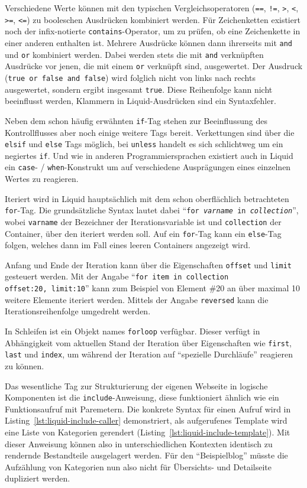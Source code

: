 Verschiedene Werte können mit den typischen Vergleichsoperatoren (\texttt{==}, \texttt{!=}, \texttt{>}, \texttt{<}, \texttt{>=}, \texttt{<=}) zu booleschen Ausdrücken kombiniert werden. Für Zeichenketten existiert noch der infix-notierte \texttt{contains}-Operator, um zu prüfen, ob eine Zeichenkette in einer anderen enthalten ist. Mehrere Ausdrücke können dann ihrerseits  mit \texttt{and} und \texttt{or} kombiniert werden. Dabei werden stets die mit \texttt{and} verknüpften Ausdrücke vor jenen, die mit einem \texttt{or} verknüpft sind, ausgewertet. Der Ausdruck (\texttt{true or false and false}) wird folglich nicht von links nach rechts ausgewertet, sondern ergibt insgesamt \texttt{true}. Diese Reihenfolge kann nicht beeinflusst werden, Klammern in Liquid-Ausdrücken sind ein Syntaxfehler.

Neben dem schon häufig erwähnten \texttt{if}-Tag stehen zur Beeinflussung des Kontrollflusses aber noch einige weitere Tags bereit. Verkettungen sind über die \texttt{elsif} und \texttt{else} Tags möglich, bei \texttt{unless} handelt es sich schlichtweg um ein negiertes \texttt{if}. Und wie in anderen Programmiersprachen existiert auch in Liquid ein \texttt{case}- / \texttt{when}-Konstrukt um auf verschiedene Ausprägungen eines einzelnen Wertes zu reagieren.

Iteriert wird in Liquid hauptsächlich mit dem schon oberflächlich betrachteten \texttt{for}-Tag. Die grundsätzliche Syntax lautet dabei "`\texttt{for~\textit{varname}~in~\textit{collection}}"', wobei \texttt{varname} der Bezeichner der Iterationsvariable ist und \texttt{collection} der Container, über den iteriert werden soll. Auf ein \texttt{for}-Tag kann ein \texttt{else}-Tag folgen, welches dann im Fall eines leeren Containers angezeigt wird.

Anfang und Ende der Iteration kann über die Eigenschaften \texttt{offset} und \texttt{limit} gesteuert werden. Mit der Angabe "`\texttt{for item in collection offset:20,~limit:10}"' kann zum Beispiel von Element \#20 an über maximal 10 weitere Elemente iteriert werden. Mittels der Angabe \texttt{reversed} kann die Iterationsreihenfolge umgedreht werden.

In Schleifen ist ein Objekt names \texttt{forloop} verfügbar. Dieser verfügt in Abhängigkeit vom aktuellen Stand der Iteration über Eigenschaften wie \texttt{first}, \texttt{last} und \texttt{index}, um während der Iteration auf "`spezielle Durchläufe"' reagieren zu können.

Das wesentliche Tag zur Strukturierung der eigenen Webseite in logische Komponenten ist die \texttt{include}-Anweisung, diese funktioniert ähnlich wie ein Funktionsaufruf mit Paremetern. Die konkrete Syntax für einen Aufruf wird in Listing~\ref{lst:liquid-include-caller} demonstriert, als aufgerufenes Template wird eine Liste von Kategorien gerendert (Listing~\ref{lst:liquid-include-template}). Mit dieser Anweisung können also in unterschiedlichen Kontexten identisch zu rendernde Bestandteile ausgelagert werden. Für den "`Beispielblog"' müsste die Aufzählung von Kategorien nun also nicht für Übersichts- und Detailseite dupliziert werden.

